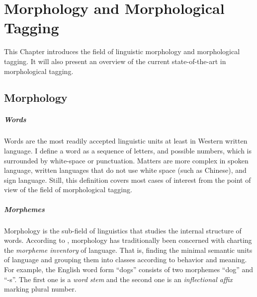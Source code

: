 \chapter{Morphology and Morphological Tagging}
\label{chap:morphology}

This Chapter introduces the field of linguistic morphology and
morphological tagging. It will also present an overview of the current
state-of-the-art in morphological tagging.

\section{Morphology}

\paragraph{Words} Words are the most readily accepted linguistic units
at least in Western written language. I define a word as a sequence of
letters, and possible numbers, which is surrounded by white-space or
punctuation. Matters are more complex in spoken language, written
languages that do not use white space (such as Chinese), and sign
language. Still, this definition covers most cases of interest from
the point of view of the field of morphological tagging.

\paragraph{Morphemes} Morphology is the sub-field of linguistics that
studies the internal structure of words. According to \cite{Bybee85},
morphology has traditionally been concerned with charting the {\it
  morpheme inventory} of language. That is, finding the minimal
semantic units of language and grouping them into classes according to
behavior and meaning. For example, the English word form ``dogs''
consists of two morphemes ``dog'' and ``-s''. The first one is a
{\it word stem} and the second one is an {\it inflectional affix}
marking plural number.

